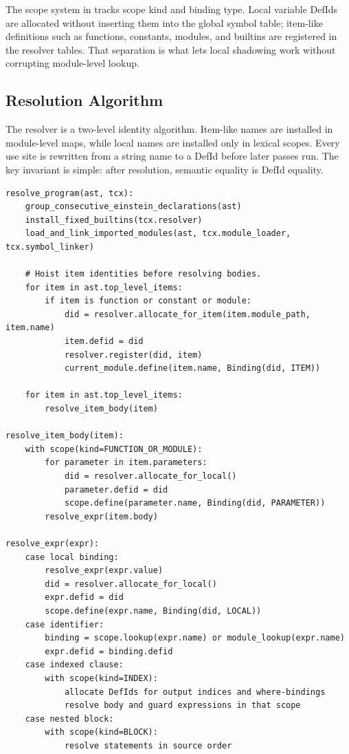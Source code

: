 The scope system in  tracks scope kind and
binding type. Local variable DefIds are allocated without inserting them into
the global symbol table; item-like definitions such as functions, constants,
modules, and builtins are registered in the resolver tables. That separation is
what lets local shadowing work without corrupting module-level lookup.

\subsection{Resolution Algorithm}

The resolver is a two-level identity algorithm. Item-like names are installed in
module-level maps, while local names are installed only in lexical scopes. Every
use site is rewritten from a string name to a DefId before later passes run.
The key invariant is simple: after resolution, semantic equality is DefId
equality.

\begin{lstlisting}[style=pythoncode,caption={DefId-based name resolution.}]
resolve_program(ast, tcx):
    group_consecutive_einstein_declarations(ast)
    install_fixed_builtins(tcx.resolver)
    load_and_link_imported_modules(ast, tcx.module_loader, tcx.symbol_linker)

    # Hoist item identities before resolving bodies.
    for item in ast.top_level_items:
        if item is function or constant or module:
            did = resolver.allocate_for_item(item.module_path, item.name)
            item.defid = did
            resolver.register(did, item)
            current_module.define(item.name, Binding(did, ITEM))

    for item in ast.top_level_items:
        resolve_item_body(item)

resolve_item_body(item):
    with scope(kind=FUNCTION_OR_MODULE):
        for parameter in item.parameters:
            did = resolver.allocate_for_local()
            parameter.defid = did
            scope.define(parameter.name, Binding(did, PARAMETER))
        resolve_expr(item.body)

resolve_expr(expr):
    case local binding:
        resolve_expr(expr.value)
        did = resolver.allocate_for_local()
        expr.defid = did
        scope.define(expr.name, Binding(did, LOCAL))
    case identifier:
        binding = scope.lookup(expr.name) or module_lookup(expr.name)
        expr.defid = binding.defid
    case indexed clause:
        with scope(kind=INDEX):
            allocate DefIds for output indices and where-bindings
            resolve body and guard expressions in that scope
    case nested block:
        with scope(kind=BLOCK):
            resolve statements in source order
\end{lstlisting}

